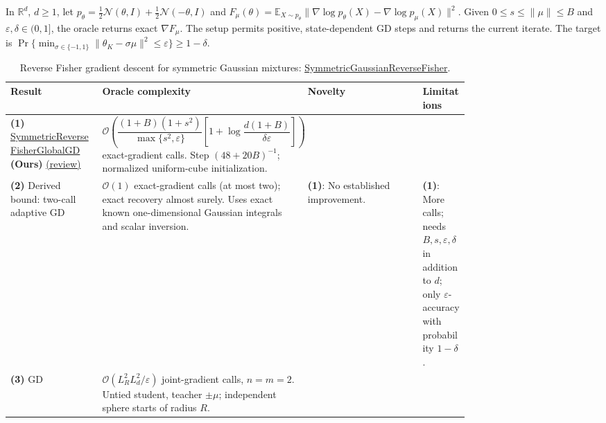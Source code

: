 \begin{table}[tp]
\centering
\caption{Reverse Fisher gradient descent for symmetric Gaussian mixtures: \href{https://github.com/k3nfalt/longtails/blob/main/LongTails/Setups/SymmetricGaussianReverseFisher.lean}{SymmetricGaussianReverseFisher}.}\label{tab:SymmetricGaussianReverseFisher}
\parbox{\linewidth}{\footnotesize In $\mathbb{R}^d$, $d\geq1$, let $p_\theta=\tfrac12\mathcal{N}(\theta,I)+\tfrac12\mathcal{N}(-\theta,I)$ and $F_\mu(\theta)=\mathbb{E}_{X\sim p_\theta}\|\nabla\log p_\theta(X)-\nabla\log p_\mu(X)\|^2$. Given $0\leq s\leq\|\mu\|\leq B$ and $\varepsilon,\delta\in(0,1]$, the oracle returns exact $\nabla F_\mu$. The setup permits positive, state-dependent GD steps and returns the current iterate. The target is $\Pr\{\min_{\sigma\in\{-1,1\}}\|\theta_K-\sigma\mu\|^2\leq\varepsilon\}\geq1-\delta$.}\par\smallskip
\begin{threeparttable}
\footnotesize
\setlength{\tabcolsep}{4pt}\renewcommand{\arraystretch}{1.25}
\begin{tabularx}{\linewidth}{@{}>{\raggedright\arraybackslash}p{0.20\linewidth}>{\raggedright\arraybackslash}p{0.32\linewidth}>{\raggedright\arraybackslash}p{0.25\linewidth}>{\raggedright\arraybackslash}X@{}}
\toprule
\textbf{Result} & \textbf{Oracle complexity} & \textbf{Novelty} & \textbf{Limitations} \\
\midrule
\textbf{(1)} \href{https://github.com/k3nfalt/longtails/blob/main/LongTails/Theorems/SymmetricReverseFisherGlobalGD.lean}{Symmetric\allowbreak Reverse\allowbreak Fisher\allowbreak Global\allowbreak GD} \textbf{(Ours)} \href{https://github.com/k3nfalt/longtails/blob/main/scripts/reviews/SymmetricReverseFisherGlobalGD.md}{(review)}
& $\mathcal{O}\!\left(\dfrac{(1+B)(1+s^2)}{\max\{s^2,\varepsilon\}}\left[1+\log\dfrac{d(1+B)}{\delta\varepsilon}\right]\right)$ exact-gradient calls. Step $(48+20B)^{-1}$; normalized uniform-cube initialization.
& & \\
\midrule[1.2pt]
\textbf{(2)} Derived bound: two-call adaptive GD
& $\mathcal{O}(1)$ exact-gradient calls (at most two); exact recovery almost surely. Uses exact known one-dimensional Gaussian integrals and scalar inversion.
& \textbf{(1)}: No established improvement.
& \textbf{(1)}: More calls; needs $B,s,\varepsilon,\delta$ in addition to $d$; only $\varepsilon$-accuracy with probability $1-\delta$. \\
\midrule
\textbf{(3)} GD \citep[Thms.~3.2, E.1]{sgrfTyurin2026v1}
& $\mathcal{O}(L_R^2L_d^2/\varepsilon)$ joint-gradient calls, $n=m=2$. Untied student, teacher $\pm\mu$; independent sphere starts of radius $R$.

\end{tabularx}
\end{threeparttable}
\end{table}
